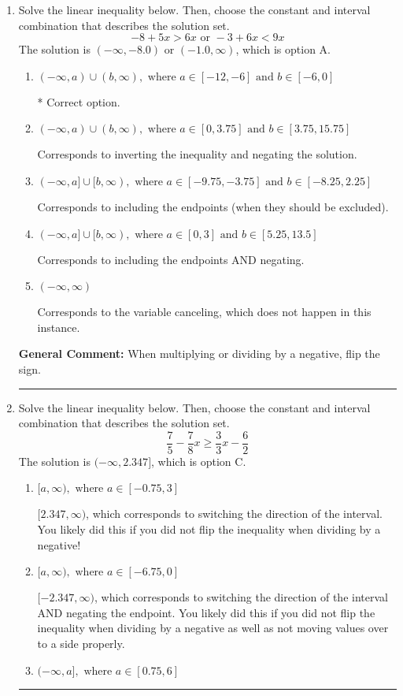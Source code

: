 \documentclass{extbook}[14pt]
\newcommand{\litem}[1]{\item #1

\rule{\textwidth}{0.4pt}}
\begin{document}
\begin{enumerate}\litem{
Solve the linear inequality below. Then, choose the constant and interval combination that describes the solution set.
\[ -8 + 5 x > 6 x \text{ or } -3 + 6 x < 9 x \]The solution is \( (-\infty, -8.0) \text{ or } (-1.0, \infty) \), which is option A.\begin{enumerate}[label=\Alph*.]
\item \( (-\infty, a) \cup (b, \infty), \text{ where } a \in [-12, -6] \text{ and } b \in [-6, 0] \)

 * Correct option.
\item \( (-\infty, a) \cup (b, \infty), \text{ where } a \in [0, 3.75] \text{ and } b \in [3.75, 15.75] \)

Corresponds to inverting the inequality and negating the solution.
\item \( (-\infty, a] \cup [b, \infty), \text{ where } a \in [-9.75, -3.75] \text{ and } b \in [-8.25, 2.25] \)

Corresponds to including the endpoints (when they should be excluded).
\item \( (-\infty, a] \cup [b, \infty), \text{ where } a \in [0, 3] \text{ and } b \in [5.25, 13.5] \)

Corresponds to including the endpoints AND negating.
\item \( (-\infty, \infty) \)

Corresponds to the variable canceling, which does not happen in this instance.
\end{enumerate}

\textbf{General Comment:} When multiplying or dividing by a negative, flip the sign.
}
\litem{
Solve the linear inequality below. Then, choose the constant and interval combination that describes the solution set.
\[ \frac{7}{5} - \frac{7}{8} x \geq \frac{3}{3} x - \frac{6}{2} \]The solution is \( (-\infty, 2.347] \), which is option C.\begin{enumerate}[label=\Alph*.]
\item \( [a, \infty), \text{ where } a \in [-0.75, 3] \)

 $[2.347, \infty)$, which corresponds to switching the direction of the interval. You likely did this if you did not flip the inequality when dividing by a negative!
\item \( [a, \infty), \text{ where } a \in [-6.75, 0] \)

 $[-2.347, \infty)$, which corresponds to switching the direction of the interval AND negating the endpoint. You likely did this if you did not flip the inequality when dividing by a negative as well as not moving values over to a side properly.
\item \( (-\infty, a], \text{ where } a \in [0.75, 6] \)


\end{enumerate}}
\end{enumerate}
\end{document}
